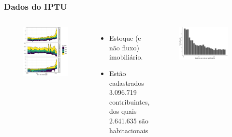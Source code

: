 \documentclass[%
    8pt, 
    aspectratio=169,
]{beamer}
\begin{document}
\begin{frame}
    \frametitle{Dados do IPTU}
    \begin{columns}
        \begin{figure}
            \centering
            \includegraphics[height = .9\textheight]{imagens/indicadores_tempo_small.pdf}
        \end{figure}

        \begin{itemize}
            \item Estoque (e não fluxo) imobiliário.
            \item Estão cadastrados 3.096.719 contribuintes, dos quais \textcolor{BrickRed}{2.641.635} são habitacionais
        \end{itemize}

        \begin{figure}
            \centering
            \includegraphics[width = .8\textwidth]{imagens/verticalizacao.pdf}
        \end{figure}
    \end{columns}
\end{frame}
\end{document}
